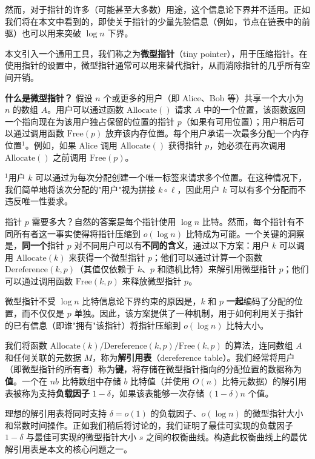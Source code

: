 \documentclass[12pt,a4paper]{ctexart}
\theoremstyle{remark}
\begin{document}
然而，对于指针的许多（可能甚至大多数）用途，这个信息论下界并不适用。正如我们将在本文中看到的，即使关于指针的少量先验信息（例如，节点在链表中的前驱）也可以用来突破 $\log n$ 下界。

本文引入一个通用工具，我们称之为\textbf{微型指针}（tiny pointer），用于压缩指针。在使用指针的设置中，微型指针通常可以用来替代指针，从而消除指针的几乎所有空间开销。

\textbf{什么是微型指针？} 假设 $n$ 个或更多的用户（即 Alice、Bob 等）共享一个大小为 $n$ 的数组 $A$。用户可以通过函数 $\text{Allocate}()$ 请求 $A$ 中的一个位置，该函数返回一个指向现在为该用户独占保留的位置的指针 $p$（如果有可用位置）；用户稍后可以通过调用函数 $\text{Free}(p)$ 放弃该内存位置。每个用户承诺一次最多分配一个内存位置$^1$。例如，如果 Alice 调用 $\text{Allocate}()$ 获得指针 $p$，她必须在再次调用 $\text{Allocate}()$ 之前调用 $\text{Free}(p)$。

$^1$用户 $k$ 可以通过为每次分配创建一个唯一标签来请求多个位置。在这种情况下，我们简单地将该次分配的"用户"视为拼接 $k\circ\ell$，因此用户 $k$ 可以有多个分配而不违反唯一性要求。

指针 $p$ 需要多大？自然的答案是每个指针使用 $\log n$ 比特。然而，每个指针有不同所有者这一事实使得将指针压缩到 $o(\log n)$ 比特成为可能。一个关键的洞察是，\textbf{同一个}指针 $p$ 对不同用户可以有\textbf{不同的含义}，通过以下方案：用户 $k$ 可以调用 $\text{Allocate}(k)$ 来获得一个微型指针 $p$；他们可以通过计算一个函数 $\text{Dereference}(k,p)$（其值仅依赖于 $k$、$p$ 和随机比特）来解引用微型指针 $p$；他们可以通过调用函数 $\text{Free}(k,p)$ 来释放微型指针 $p$。

微型指针不受 $\log n$ 比特信息论下界约束的原因是，$k$ 和 $p$ \textbf{一起}编码了分配的位置，而不仅仅是 $p$ 单独。因此，该方案提供了一种机制，用于如何利用关于指针的已有信息（即谁"拥有"该指针）将指针压缩到 $o(\log n)$ 比特大小。

我们将函数 $\text{Allocate}(k)/\text{Dereference}(k,p)/\text{Free}(k,p)$ 的算法，连同数组 $A$ 和任何关联的元数据 $M$，称为\textbf{解引用表}（dereference table）。我们经常将用户（即微型指针的所有者）称为\textbf{键}，将存储在微型指针指向的分配位置的数据称为\textbf{值}。一个在 $nb$ 比特数组中存储 $b$ 比特值（并使用 $O(n)$ 比特元数据）的解引用表被称为支持\textbf{负载因子} $1-\delta$，如果该表能够一次存储 $(1-\delta)n$ 个值。

理想的解引用表将同时支持 $\delta=o(1)$ 的负载因子、$o(\log n)$ 的微型指针大小和常数时间操作。正如我们稍后将讨论的，我们证明了最佳可实现的负载因子 $1-\delta$ 与最佳可实现的微型指针大小 $s$ 之间的权衡曲线。构造此权衡曲线上的最优解引用表是本文的核心问题之一。
\end{document}
